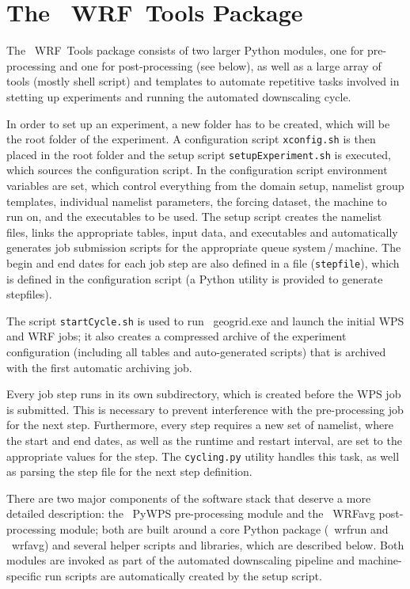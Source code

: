 \documentclass[letterpaper,12pt,headsepline,final]{scrartcl} %
\newcommand{\wrftools}{\mbox{\color{violet} \sffamily WRF~Tools}}
\newcommand{\geogrid}{\mbox{\color{orange} \ttfamily geogrid.exe}}
\newcommand{\PyWPS}{\mbox{\color{teal} \sffamily PyWPS}}
\newcommand{\wrfrun}{\mbox{\color{teal} \ttfamily wrfrun}}
\newcommand{\WRFavg}{\mbox{\color{blue} \sffamily WRFavg}}
\newcommand{\wrfavg}{\mbox{\color{blue} \ttfamily wrfavg}}
\begin{document}
\section{The \wrftools{} Package}
\label{pipe:tool}
The \wrftools{} package consists of two larger Python modules, one for pre-processing and one for post-processing (see below), as well as a large array of tools (mostly shell script) and templates to automate repetitive tasks involved in stetting up experiments and running the automated downscaling cycle.

In order to set up an experiment, a new folder has to be created, which will be the root folder of the experiment. A configuration script \texttt{xconfig.sh} is then placed in the root folder and the setup script \texttt{setupExperiment.sh} is executed, which sources the configuration script. In the configuration script environment variables are set, which control everything from the domain setup, namelist group templates, individual namelist parameters, the forcing dataset, the machine to run on, and the executables to be used.
The setup script creates the namelist files, links the appropriate tables, input data, and executables and automatically generates job submission scripts for the appropriate queue system\,/\,machine. The begin and end dates for each job step are also defined in a file (\texttt{stepfile}), which is defined in the configuration script (a Python utility is provided to generate stepfiles).

The script \texttt{startCycle.sh} is used to run \geogrid{} and launch the initial WPS and WRF jobs; it also creates a compressed archive of the experiment configuration (including all tables and auto-generated scripts) that is archived with the first automatic archiving job.

Every job step runs in its own subdirectory, which is created before the WPS job is submitted. This is necessary to prevent interference with the pre-processing job for the next step. Furthermore, every step requires a new set of namelist, where the start and end dates, as well as the runtime and restart interval, are set to the appropriate values for the step. The \texttt{cycling.py} utility handles this task, as well as parsing the step file for the next step definition.

There are two major components of the software stack that deserve a more detailed description: the \PyWPS{} pre-processing module and the \WRFavg{} post-processing module; both are built around a core Python package (\wrfrun{} and \wrfavg{}) and several helper scripts and libraries, which are described below. Both modules are invoked as part of the automated downscaling pipeline and machine-specific run scripts are automatically created by the setup script.
\end{document}

